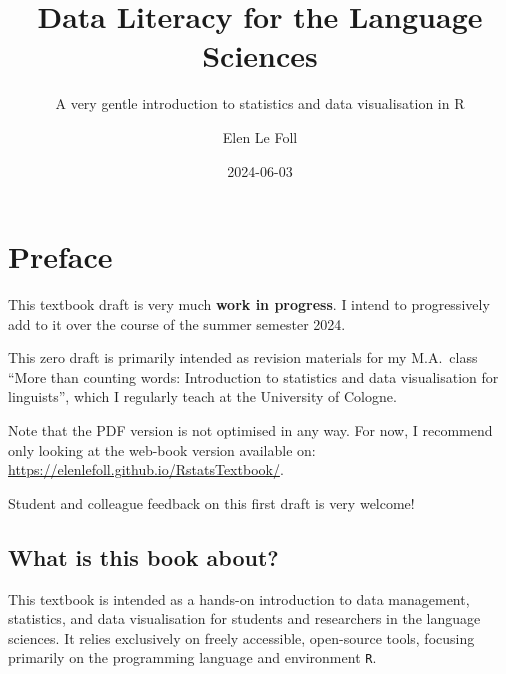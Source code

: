 \documentclass[
  letterpaper,
  DIV=11,
  numbers=noendperiod]{scrreprt}
\title{Data Literacy for the Language Sciences}
\subtitle{A very gentle introduction to statistics and data
visualisation in R}
\author{Elen Le Foll}
\date{2024-06-03}
\renewcommand*\contentsname{Table of contents}
\newcommand\contentsname{Table of contents}
\begin{document}
\maketitle

\renewcommand*\contentsname{Table of contents}
{
\hypersetup{linkcolor=}
\setcounter{tocdepth}{2}
\tableofcontents
}

\chapter*{Preface}\label{preface}


\begin{tcolorbox}[enhanced jigsaw, colbacktitle=quarto-callout-warning-color!10!white, titlerule=0mm, toptitle=1mm, breakable, rightrule=.15mm, toprule=.15mm, leftrule=.75mm, colframe=quarto-callout-warning-color-frame, arc=.35mm, colback=white, left=2mm, opacityback=0, opacitybacktitle=0.6, coltitle=black, bottomtitle=1mm, title=\textcolor{quarto-callout-warning-color}{\faExclamationTriangle}\hspace{0.5em}{Warning}, bottomrule=.15mm]

This textbook draft is very much \textbf{work in progress}. I intend to
progressively add to it over the course of the summer semester 2024.

This zero draft is primarily intended as revision materials for my
M.A.~class ``More than counting words: Introduction to statistics and
data visualisation for linguists'', which I regularly teach at the
University of Cologne.

Note that the PDF version is not optimised in any way. For now, I
recommend only looking at the web-book version available on:
\url{https://elenlefoll.github.io/RstatsTextbook/}.

Student and colleague feedback on this first draft is very welcome!

\end{tcolorbox}

\section*{What is this book about?}\label{what-is-this-book-about}


This textbook is intended as a hands-on introduction to data management,
statistics, and data visualisation for students and researchers in the
language sciences. It relies exclusively on freely accessible,
open-source tools, focusing primarily on the programming language and
environment \texttt{R}.
\end{document}
